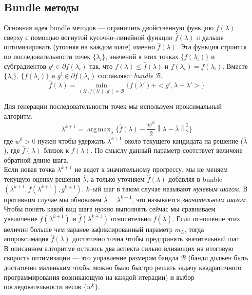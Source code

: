 \documentclass{article}
\DeclareMathOperator*{\argmax}{arg\,max}
\begin{document}
\subsection{Bundle методы}
Основная идея bundle методов --- ограничить двойственную функцию $f(\lambda)$ сверху с помощью вогнутой кусочно--линейной функции $\hat{f}(\lambda)$ и дальше оптимизировать (уточняя на каждом шаге) именно $\hat{f}(\lambda)$. Эта функция строится по последовательности точек $\{\lambda_i\}$, значений в этих точках $\{f(\lambda_i)\}$ и субградиентов $g^i \in \partial f(\lambda_i)$ так, что $f(\lambda) \leq \hat{f}(\lambda)$ и $f(\lambda_i) = \hat{f}(\lambda_i)$. Вместе $\{\lambda_i\}$, $\{f(\lambda_i)\}$ и  $g^i \in \partial f(\lambda_i)$ составляют \textit{bundle} $\mathcal{B}$.
\begin{equation}
\hat{f}(\lambda) = \min_{(\lambda{}', f(\lambda{}'), g{}') \in \mathcal{B}} \{f(\lambda{}') + <g{}', \lambda - \lambda{}'>\}
\end{equation}

Для генерации последовательности точек мы используем проксимальный алгоритм:\\
\begin{equation}
\lambda^{k + 1} = \argmax_{\lambda} \{\hat{f}(\lambda)  - \frac{w^k}{2} \left \| \lambda - \overline{\lambda} \right \|_2^2\}
\end{equation}
где $w^k > 0$ нужен чтобы удержать $\lambda^{k + 1}$ около текущего кандидата на решение ($\overline{\lambda}$), где $\hat{f}(\lambda)$ близок к $f(\lambda)$. По смыслу данный параметр соотствует величене обратной длине шага.\\
Если новая точка $\lambda^{k + 1}$ не ведет к значительному прогрессу, мы не меняем текущую оценку решения $\overline{\lambda}$, а только уточняем $\hat{f}(\lambda)$ добавляя в bunble $(\lambda^{k+1}, f(\lambda^{k+1}), g^{k+1})$. $k$--ый шаг в таком случае называют \textit{нулевым шагом}. В противном случае мы обновляем $\overline{\lambda} = \lambda^{k + 1}$, это называется \textit{значительным шагом}. Чтобы понять какой вид шага нужно выполнять сейчас мы сравниваем увеличение $f(\lambda^{k+1})$ и $\hat{f}(\lambda^{k+1})$ относительно $f(\overline{\lambda})$. Если отношение этих величин больше чем заранее зафиксированный параметр $m_L$, тогда аппроксимация $\hat{f}(\lambda)$ достаточно точна чтобы предпринять значительный шаг.\\


В описанном алгоритме осталось два аспекта сильно влияющих на итоговую скорость оптимизации --- это управление размером бандла $\mathcal{B}$ (бандл должен быть достаточно маленьким чтобы можно было быстро решать задачу квадратичного программирования возникающую на каждой итерации) и выбор последовательности весов $\{w^k\}$.
\end{document}
